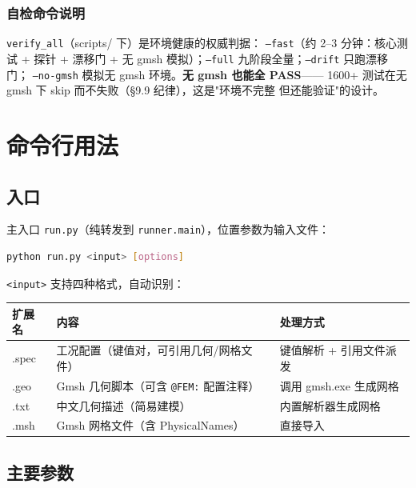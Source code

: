 \documentclass[12pt,a4paper]{ctexart}
\newcommand{\fem}{\Verb}
\begin{document}
\subsubsection{自检命令说明}

\fem|verify_all|（scripts/ 下）是环境健康的权威判据：
\texttt{--fast}（约 2--3 分钟：核心测试 + 探针 + 漂移门 + 无 gmsh
模拟）；\texttt{--full} 九阶段全量；\texttt{--drift} 只跑漂移门；
\texttt{--no-gmsh} 模拟无 gmsh 环境。\textbf{无 gmsh 也能全 PASS}——
1600+ 测试在无 gmsh 下 skip 而不失败（§9.9 纪律），这是"环境不完整
但还能验证"的设计。

\section{命令行用法}

\subsection{入口}

主入口 \fem|run.py|（纯转发到 \fem|runner.main|），位置参数为输入文件：

\begin{lstlisting}[language=bash]
python run.py <input> [options]
\end{lstlisting}

\fem|<input>| 支持四种格式，自动识别：

\begin{table}[h]
\centering
\small
\begin{tabular}{lll}
\toprule
\textbf{扩展名} & \textbf{内容} & \textbf{处理方式} \\
\midrule
.spec & 工况配置（键值对，可引用几何/网格文件） & 键值解析 + 引用文件派发 \\
.geo & Gmsh 几何脚本（可含 \fem|@FEM:| 配置注释） & 调用 gmsh.exe 生成网格 \\
.txt & 中文几何描述（简易建模） & 内置解析器生成网格 \\
.msh & Gmsh 网格文件（含 PhysicalNames） & 直接导入 \\
\bottomrule
\end{tabular}
\end{table}

\subsection{主要参数}
\end{document}
